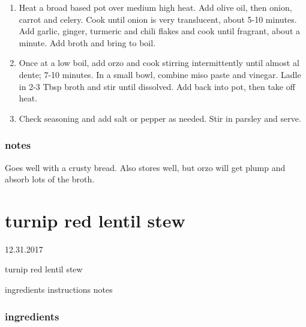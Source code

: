 \documentclass[]{book}
\providecommand{\tightlist}{%
  \setlength{\itemsep}{0pt}\setlength{\parskip}{0pt}}
\begin{document}
\begin{enumerate}
\def\labelenumi{\arabic{enumi}.}
\tightlist
\item
  Heat a broad based pot over medium high heat. Add olive oil, then onion, carrot and celery. Cook until onion is
  very translucent, about 5-10 minutes. Add garlic, ginger, turmeric and chili flakes and cook until fragrant, about a
  minute. Add broth and bring to boil.
\item
  Once at a low boil, add orzo and cook stirring intermittently until almost al dente; 7-10 minutes. In a small bowl,
  combine miso paste and vinegar. Ladle in 2-3 Tbsp broth and stir until dissolved. Add back into pot, then take off
  heat.
\item
  Check seasoning and add salt or pepper as needed. Stir in parsley and serve.
\end{enumerate}

\hypertarget{notes-19}{%
\subsection{notes}\label{notes-19}}

Goes well with a crusty bread. Also stores well, but orzo will get plump and absorb
lots of the broth.

\hypertarget{turnip-red-lentil-stew}{%
\chapter{turnip red lentil stew}\label{turnip-red-lentil-stew}}

12.31.2017

turnip red lentil stew

ingredients \textbar{}
instructions \textbar{}
notes

\hypertarget{ingredients-20}{%
\subsection{ingredients}\label{ingredients-20}}
\end{document}
